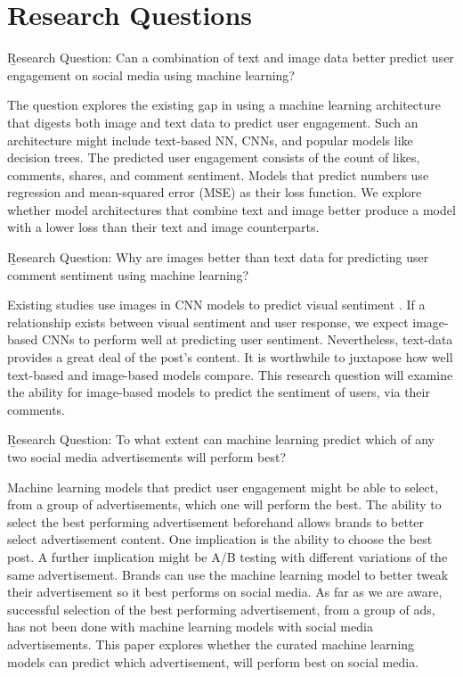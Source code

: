 \documentclass[mksc,blindrev]{informs3} %
\begin{document}
\section{Research Questions}
\b{Research Question:} Can a combination of text and image data better predict user engagement on social media using machine learning?


The question explores the existing gap in using a machine learning architecture that digests both image and text data to predict user engagement. Such an architecture might include text-based NN, CNNs, and popular models like decision trees. The predicted user engagement consists of the count of likes, comments, shares, and comment sentiment. Models that predict numbers use regression and mean-squared error (MSE) as their loss function. We explore whether model architectures that combine text and image better produce a model with a lower loss than their text and image counterparts. 

\b{Research Question:} Why are images better than text data for predicting user comment sentiment using machine learning?


Existing studies use images in CNN models to predict visual sentiment \cite{Segalin2017, Xu2014}. If a relationship exists between visual sentiment and user response, we expect image-based CNNs to perform well at predicting user sentiment. Nevertheless, text-data provides a great deal of the post's content. It is worthwhile to juxtapose how well text-based and image-based models compare. This research question will examine the ability for image-based models to predict the sentiment of users, via their comments.

\b{Research Question:} To what extent can machine learning predict which of any two social media advertisements will perform best?


Machine learning models that predict user engagement might be able to select, from a group of advertisements, which one will perform the best. The ability to select the best performing advertisement beforehand allows brands to better select advertisement content. One implication is the ability to choose the best post. A further implication might be A/B testing with different variations of the same advertisement. Brands can use the machine learning model to better tweak their advertisement so it best performs on social media. As far as we are aware, successful selection of the best performing advertisement, from a group of ads, has not been done with machine learning models with social media advertisements. This paper explores whether the curated machine learning models can predict which advertisement, will perform best on social media.
\end{document}
